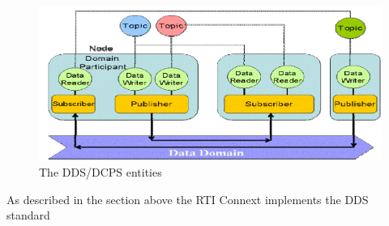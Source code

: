\documentclass[Main]{subfiles}
\begin{document}
\begin{figure}[H]
\centering
\includegraphics[scale=1]{Figure/DDSentities.png}
\caption{The DDS/DCPS entities \cite{RTI}}
\label{Fig:Entities}
\end{figure}



As described in the section above the RTI Connext implements the DDS standard
\end{document}
